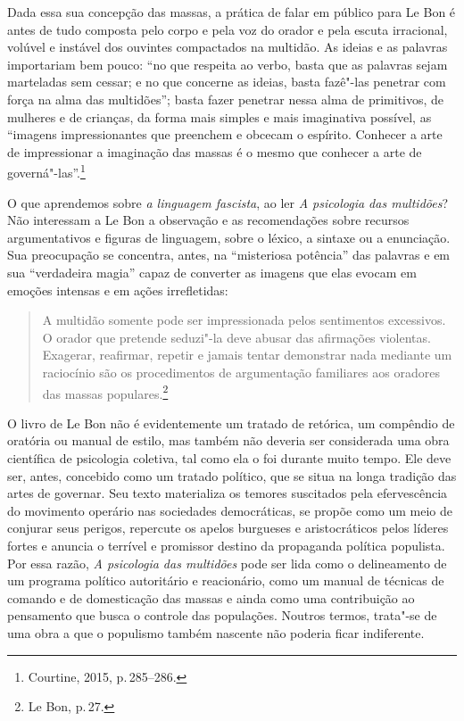 Dada essa sua concepção das massas, a prática de falar em público para
Le Bon é antes de tudo composta pelo corpo e pela voz do orador e pela
escuta irracional, volúvel e instável dos ouvintes compactados na
multidão. As ideias e as palavras importariam bem pouco: ``no que
respeita ao verbo, basta que as palavras sejam marteladas sem cessar; e
no que concerne as ideias, basta fazê"-las penetrar com força na alma das
multidões''; basta fazer penetrar nessa alma de primitivos, de mulheres
e de crianças, da forma mais simples e mais imaginativa possível, as
``imagens impressionantes que preenchem e obcecam o espírito. Conhecer a
arte de impressionar a imaginação das massas é o mesmo que conhecer a
arte de governá"-las''.\footnote{Courtine, 2015, p.\,285--286.}

O que aprendemos sobre \emph{a linguagem fascista}, ao ler
\emph{A psicologia das multidões}? Não interessam a Le Bon a observação
e as recomendações sobre recursos argumentativos e figuras de linguagem,
sobre o léxico, a sintaxe ou a enunciação. Sua preocupação se concentra,
antes, na ``misteriosa potência'' das palavras e em sua ``verdadeira
magia'' capaz de converter as imagens que elas evocam em emoções
intensas e em ações irrefletidas:

\begin{quote}
A multidão somente pode ser impressionada pelos sentimentos excessivos.
O orador que pretende seduzi"-la deve abusar das afirmações violentas.
Exagerar, reafirmar, repetir e jamais tentar demonstrar nada mediante um
raciocínio são os procedimentos de argumentação familiares aos oradores
das massas populares.\footnote{Le Bon, p.\,27.}
\end{quote}

O livro de Le Bon não é evidentemente um tratado de retórica, um
compêndio de oratória ou manual de estilo, mas também não deveria ser
considerada uma obra científica de psicologia coletiva, tal como ela o
foi durante muito tempo. Ele deve ser, antes, concebido como um tratado
político, que se situa na longa tradição das artes de governar. Seu
texto materializa os temores suscitados pela efervescência do movimento
operário nas sociedades democráticas, se propõe como um meio de conjurar
seus perigos, repercute os apelos burgueses e aristocráticos pelos
líderes fortes e anuncia o terrível e promissor destino da propaganda
política populista. Por essa razão, \emph{A psicologia das multidões}
pode ser lida como o delineamento de um programa político autoritário e
reacionário, como um manual de técnicas de comando e de domesticação das
massas e ainda como uma contribuição ao pensamento que busca o controle
das populações. Noutros termos, trata"-se de uma obra a que o populismo
também nascente não poderia ficar indiferente.

